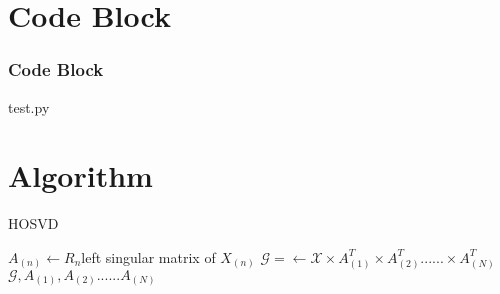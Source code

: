 \section{Code Block}

\begin{frame}
  \frametitle{Code Block}
  
  {test.py}
\end{frame}

\section{Algorithm}

\begin{frame}
  \begin{algorithm}[H]
    \caption{HOSVD}
    \small 
    
    {
      $A_{(n)}\leftarrow R_{n}$left singular matrix of $X_{(n)}$
    }
    $\mathcal{G}=\leftarrow \mathcal{X} \times A_{(1)}^{T} \times A_{(2)}^{T}...... \times A_{(N)}^{T}$\\
    \Return $\mathcal{G},A_{(1)},A_{(2)}......A_{(N)} $
  \end{algorithm}
\end{frame}
